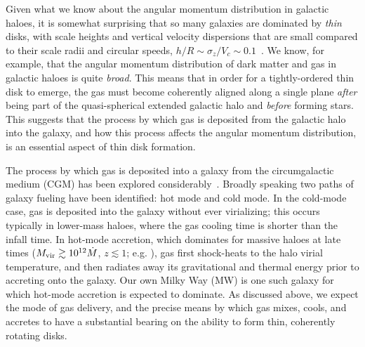 \documentclass[fleqn,usenatbib]{mnras}
\newcommand{\Mdot}{\dot{M}}
\begin{document}
Given what we know about the angular momentum distribution in galactic haloes, it is somewhat surprising that so many galaxies are dominated by {\em thin} disks, with  scale heights and vertical velocity dispersions that are small compared to their scale radii and circular speeds, $h/R \sim \sigma_z/V_c \sim 0.1$~\citep[][]{Kregel2002}.
We know, for example, that the angular momentum distribution of dark matter \citep{Bullock2001,Lian2018} and gas \citep{Stewart2013,DeFelippis2020} in galactic haloes is quite \textit{broad}.
This means that in order for a tightly-ordered thin disk to emerge, the gas must become coherently aligned along a single plane \textit{after} being part of the quasi-spherical extended galactic halo and \textit{before} forming stars.
This suggests that the process by which gas is deposited from the galactic halo into the galaxy, and how this process affects the angular momentum distribution, is an essential aspect of thin disk formation.

The process by which gas is deposited into a galaxy from the circumgalactic medium (CGM) has been explored considerably~\citep[e.g.][]{Keres2005, Keres2009a, Dekel2006, Faucher-Giguere2011a, VanDeVoort2011a, Angles-Alcazar2017, Stevens2017, Martin2019a}.
Broadly speaking two paths of galaxy fueling have been identified: hot mode and cold mode.
In the cold-mode case, gas is deposited into the galaxy without ever virializing; this occurs typically in lower-mass haloes, where the gas cooling time is shorter than the infall time.
In hot-mode accretion, which dominates for massive haloes at late times ($M_{\rm vir} \gtrsim 10^{12} \Mdot$, $z \lesssim 1$; e.g. \citealt{Faucher-Giguere2011a, VandeVoort2011, VandeVoort2012a, Joung2012, Murante2012, Nelson2013, Fielding2017}), gas first shock-heats to the halo virial temperature, and then radiates away its gravitational and thermal energy prior to accreting onto the galaxy.
Our own Milky Way (MW) is one such galaxy for which hot-mode accretion is expected to dominate.
As discussed above, we expect the mode of gas delivery, and the precise means by which gas mixes, cools, and accretes to have a substantial bearing on the ability to form thin, coherently rotating disks.
\end{document}
